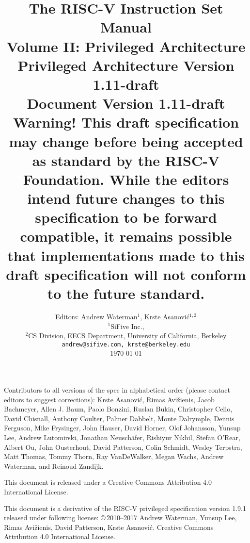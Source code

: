 \documentclass[twoside,11pt]{book}
\newcommand{\privrev}{1.11-draft}
\begin{document}
\title{{\vspace{-0.7in}\Large {\bf The RISC-V Instruction Set Manual}} \\
  \large {\bf Volume II: Privileged Architecture} \\
  Privileged Architecture Version \privrev \\
  Document Version \privrev \\
    {\bf Warning! This draft specification
    may change before being accepted as standard by the RISC-V Foundation.
    While the editors intend future changes to this specification to be
    forward compatible, it remains possible that
    implementations made to this draft specification will not conform
    to the future standard.}
  \vspace{-0.1in}}

\author{Editors: Andrew Waterman$^{1}$, Krste Asanovi\'{c}$^{1,2}$ \\
  $^{1}$SiFive Inc., \\
  $^{2}$CS Division, EECS Department, University of California, Berkeley \\
  {\tt andrew@sifive.com, krste@berkeley.edu} \\
  \today
}

\date{} 
\maketitle

Contributors to all versions of the spec in alphabetical order (please
contact editors to suggest corrections): Krste Asanovi\'{c}, Rimas
Avi\v{z}ienis, Jacob Bachmeyer, Allen J. Baum, Paolo Bonzini, Ruslan
Bukin, Christopher Celio, David Chisnall, Anthony Coulter, Palmer
Dabbelt, Monte Dalrymple, Dennis Ferguson, Mike Frysinger, John
Hauser, David Horner, Olof Johansson, Yunsup Lee, Andrew Lutomirski,
Jonathan Neusch{\"a}fer, Rishiyur Nikhil, Stefan O'Rear, Albert Ou,
John Ousterhout, David Patterson, Colin Schmidt, Wesley Terpstra, Matt
Thomas, Tommy Thorn, Ray VanDeWalker, Megan Wachs, Andrew Waterman,
and Reinoud Zandijk.

This document is released under a Creative Commons Attribution 4.0
International License.

This document is a derivative of the RISC-V
privileged specification version 1.9.1 released under following license:
\copyright \,2010--2017 Andrew Waterman, Yunsup Lee, Rimas
Avi\v{z}ienis, David Patterson, Krste Asanovi\'{c}. 
Creative Commons Attribution 4.0 International License.
\end{document}
